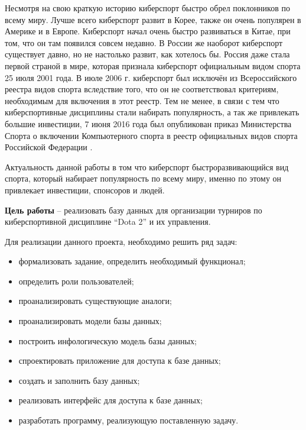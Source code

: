 Несмотря на свою краткую историю киберспорт быстро обрел поклонников по всему миру. Лучше всего киберспорт развит в Корее, также он очень популярен в Америке и в Европе. Киберспорт начал очень быстро развиваться в Китае, при том, что он там появился совсем недавно. В России же наоборот киберспорт существует давно, но не настолько развит, как хотелось бы. Россия даже стала первой страной в мире, которая признала киберспорт официальным видом спорта 25 июля 2001 года. В июле 2006 г. киберспорт был исключён из Всероссийского реестра видов спорта вследствие того, что он не соответствовал критериям, необходимым для включения в этот реестр. Тем не менее, в связи с тем что киберспортивные дисциплины стали набирать популярность, а так же привлекать большие инвестиции,  7 июня 2016 года был опубликован приказ Министерства Спорта о включении Компьютерного спорта в реестр официальных видов спорта Российской Федерации \cite{prikaz}. 

Актуальность данной работы в том что киберспорт быстроразвивающийся вид спорта, который набирает популярность по всему миру, именно по этому он привлекает инвестиции, спонсоров и людей. 

\textbf{Цель работы} – реализовать базу данных 	для организации турниров по киберспортивной дисциплине “Dota 2” и их управления.

Для реализации данного проекта, необходимо решить ряд задач:
\begin{itemize}
	\item формализовать задание, определить необходимый функционал;
	\item определить роли пользователей;
	\item проанализировать существующие аналоги;
	\item проанализировать модели базы данных;
	\item построить инфологическую модель базы данных;
	\item спроектировать приложение для доступа к базе данных;
	\item создать и заполнить базу данных;
	\item реализовать интерфейс для доступа к базе данных;
	\item разработать программу, реализующую поставленную задачу.
\end{itemize}
